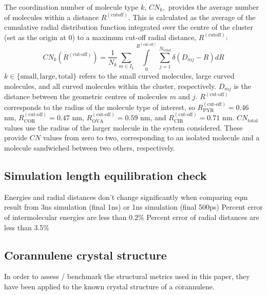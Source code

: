 The coordination number of molecule type $k$, $CN_{k},$ provides the average number of molecules within a distance $R^{(\text{cutoff})}$. This is calculated as the average of the cumulative radial distribution function integrated over the centre of the cluster (set as the origin at 0) to a maximum cut-off radial distance, $R^{(\text{cutoff})}$:
\begin{equation}
    CN_{k}(R^{(\text{cut-off})}) = \frac{1}{N_{k}} \sum_{m \in I_{k}} \int\limits_{0}^{R^{(\text{cut-off})}}  \sum_{j=1}^{N_{\text{total}}} \delta(D_{mj} - R) dR
\end{equation}
$k \in \{\text{small}, \text{large}, \text{total}\}$ refers to the small curved molecules, large curved molecules, and all curved molecules within the cluster, respectively. $D_{mj}$ is the distance between the geometric centres of molecules $m$ and $j$. $R^{(\text{cut-off})}$ corresponds to the radius of the molecule type of interest, so $R^{(\text{cut-off})}_{\text{PYR}} = 0.46$ nm, $R^{(\text{cut-off})}_{\text{COR}} = 0.47$ nm, $R^{(\text{cut-off})}_{\text{OVA}} = 0.59$ nm, and $R^{(\text{cut-off})}_{\text{CIR}} = 0.71$ nm. $CN_{\text{total}}$ values use the radius of the larger molecule in the system considered. These provide $CN$ values from zero to two, corresponding to an isolated molecule and a molecule sandwiched between two others, respectively.



\subsection{Simulation length equilibration check}
Energies and radial distances don't change significantly when comparing eqm result from 3ns simulation (final 1ns) or 1ns simulation (final 500ps)
Percent error of intermolecular energies are less than 0.2\%
Percent error of radial distances are less than 3.5\%



\subsection{Corannulene crystal structure}
In order to assess / benchmark the structural metrics used in this paper, they have been applied to the known crystal structure of a corannulene. %

